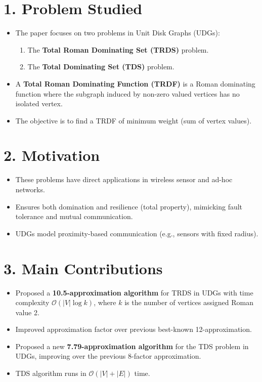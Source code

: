 \documentclass{article}
\begin{document}
\section*{1. Problem Studied}
\begin{itemize}[leftmargin=1.5em]
    \item The paper focuses on two problems in Unit Disk Graphs (UDGs):
    \begin{enumerate}
        \item The \textbf{Total Roman Dominating Set (TRDS)} problem.
        \item The \textbf{Total Dominating Set (TDS)} problem.
    \end{enumerate}
    \item A \textbf{Total Roman Dominating Function (TRDF)} is a Roman dominating function where the subgraph induced by non-zero valued vertices has no isolated vertex.
    \item The objective is to find a TRDF of minimum weight (sum of vertex values).
\end{itemize}

\section*{2. Motivation}
\begin{itemize}[leftmargin=1.5em]
    \item These problems have direct applications in wireless sensor and ad-hoc networks.
    \item Ensures both domination and resilience (total property), mimicking fault tolerance and mutual communication.
    \item UDGs model proximity-based communication (e.g., sensors with fixed radius).
\end{itemize}

\section*{3. Main Contributions}
\begin{itemize}[leftmargin=1.5em]
    \item Proposed a \textbf{10.5-approximation algorithm} for TRDS in UDGs with time complexity \( \mathcal{O}(|V| \log k) \), where \( k \) is the number of vertices assigned Roman value 2.
    \item Improved approximation factor over previous best-known 12-approximation.
    \item Proposed a new \textbf{7.79-approximation algorithm} for the TDS problem in UDGs, improving over the previous 8-factor approximation.
    \item TDS algorithm runs in \( \mathcal{O}(|V| + |E|) \) time.
\end{itemize}
\end{document}
